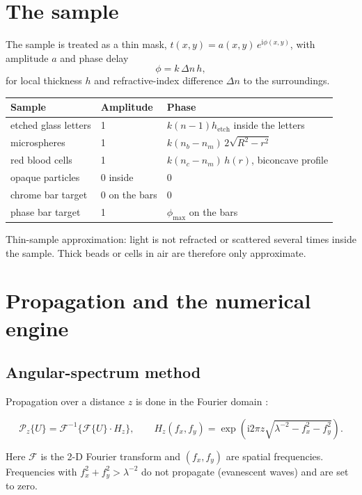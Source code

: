 \documentclass[12pt,a4paper]{article}
\newcommand{\F}{\mathcal{F}}
\newcommand{\Prop}{\mathcal{P}}
\newcommand{\ui}{\mathrm{i}}
\begin{document}
\section{The sample}
\label{sec:sample}
The sample is treated as a thin mask, $t(x,y)=a(x,y)\,e^{\ui\phi(x,y)}$, with amplitude $a$ and phase delay
\begin{equation}
\phi=k\,\Delta n\,h,
\end{equation}
for local thickness $h$ and refractive-index difference $\Delta n$ to the surroundings.
\begin{center}
\renewcommand{\arraystretch}{1.25}
\begin{tabular}{@{}p{4.0cm} p{2.6cm} p{7.4cm}@{}}
\toprule
\textbf{Sample} & \textbf{Amplitude} & \textbf{Phase}\\
\midrule
etched glass letters & 1 & $k(n-1)h_\mathrm{etch}$ inside the letters\\
microspheres & 1 & $k(n_b-n_m)\,2\sqrt{R^2-r^2}$\\
red blood cells & 1 & $k(n_c-n_m)\,h(r)$, biconcave profile \cite{Evans}\\
opaque particles & 0 inside & 0\\
chrome bar target & 0 on the bars & 0\\
phase bar target & 1 & $\phi_\mathrm{max}$ on the bars\\
\bottomrule
\end{tabular}
\end{center}
\begin{limit}
Thin-sample approximation: light is not refracted or scattered several times inside the sample. Thick beads or cells in air are therefore only approximate.
\end{limit}

\section{Propagation and the numerical engine}
\label{sec:asm}

\subsection{Angular-spectrum method}
Propagation over a distance $z$ is done in the Fourier domain \cite{Goodman}:
\begin{keyeq}
\begin{equation}
\Prop_z\{U\}=\F^{-1}\!\Big\{\F\{U\}\cdot H_z\Big\},\qquad
H_z(f_x,f_y)=\exp\!\left(\ui2\pi z\sqrt{\lambda^{-2}-f_x^2-f_y^2}\right).
\end{equation}
\end{keyeq}
Here $\F$ is the 2-D Fourier transform and $(f_x,f_y)$ are spatial frequencies. Frequencies with $f_x^2+f_y^2>\lambda^{-2}$ do not propagate (evanescent waves) and are set to zero.
\end{document}
